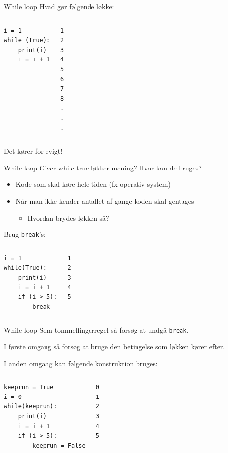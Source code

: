 \begin{frame}[fragile]{While loop}
Hvad gør følgende løkke:
\begin{columns}
\begin{lstlisting}[style=python]
i = 1
while (True):
	print(i)
	i = i + 1
\end{lstlisting}
\pause
{}
\begin{lstlisting}[style=python]
1
2
3
4
5
6
7
8
.
.
.
\end{lstlisting}
\end{columns}
Det kører for evigt!
\end{frame}


\begin{frame}[fragile]{While loop}
Giver while-true løkker mening? Hvor kan de bruges?
\pause
\begin{itemize}
\item Kode som skal køre hele tiden (fx operativ system)
\item Når man ikke kender antallet af gange koden skal gentages
\begin{itemize}
\item Hvordan brydes løkken så?
\end{itemize}
\end{itemize}
\pause
Brug \texttt{break}'s:
\begin{columns}
\begin{lstlisting}[style=python]
i = 1
while(True):
	print(i)
	i = i + 1
	if (i > 5):
		break
\end{lstlisting}
\pause
{}
\begin{lstlisting}[style=python]
1
2
3
4
5
\end{lstlisting}
\end{columns}
\end{frame}

\begin{frame}[fragile]{While loop}
Som tommelfingerregel så forsøg at undgå \texttt{break}.

I første omgang så forsøg at bruge den betingelse som løkken kører efter.
\pause

I anden omgang kan følgende konstruktion bruges:
\begin{columns}
	\begin{lstlisting}[style=python]
keeprun = True
i = 0
while(keeprun):
	print(i)
	i = i + 1
	if (i > 5):
		keeprun = False
	\end{lstlisting}
	\pause
	\begin{lstlisting}[style=python]
0
1
2
3
4
5
	\end{lstlisting}
\end{columns}
\end{frame}

